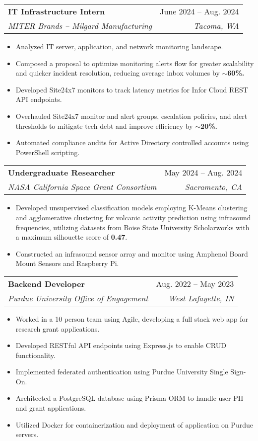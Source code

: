 \documentclass[letterpaper,11pt]{article}
\makeatletter
\newcommand{\resumeItem}[1]{
  \item\small{
    {#1 \vspace{-2pt}}
  }
}
\newcommand{\resumeSubheading}[4]{
  \vspace{-2pt}\item
    \begin{tabular*}{0.97\textwidth}[t]{l@{\extracolsep{\fill}}r}
      \textbf{#1} & #2 \\
      \textit{\small#3} & \textit{\small #4} \\
    \end{tabular*}\vspace{-7pt}
}
\newcommand{\resumeSubSubheading}[2]{
    \item
    \begin{tabular*}{0.97\textwidth}{l@{\extracolsep{\fill}}r}
      \textit{\small#1} & \textit{\small #2} \\
    \end{tabular*}\vspace{-7pt}
}
\newcommand{\resumeSubHeadingListEnd}{\end{itemize}}
\newcommand{\resumeItemListStart}{\begin{itemize}}
\newcommand{\resumeItemListEnd}{\end{itemize}\vspace{-5pt}}
\makeatother
\begin{document}
    \resumeSubheading
      {IT Infrastructure Intern}{June 2024 -- Aug. 2024}
      {MITER Brands -- Milgard Manufacturing}{Tacoma, WA}
      \resumeItemListStart
        \resumeItem{Analyzed IT server, application, and network monitoring landscape.}
        \resumeItem{Composed a proposal to optimize monitoring alerts flow for greater scalability and quicker incident resolution, reducing average inbox volumes by \textbf{$\sim$60\%.}}
        \resumeItem{Developed Site24x7 monitors to track latency metrics for Infor Cloud REST API endpoints.}
        \resumeItem{Overhauled Site24x7 monitor and alert groups, escalation policies, and alert thresholds to mitigate tech debt and improve efficiency by \textbf{$\sim$20\%.}}
        \resumeItem{Automated compliance audits for Active Directory controlled accounts using PowerShell scripting.}
      \resumeItemListEnd
      

    \resumeSubheading
      {Undergraduate Researcher}{May 2024 -- Aug. 2024}
      {NASA California Space Grant Consortium}{Sacramento, CA}
      \resumeItemListStart
      \resumeItem{Developed unsupervised classification models employing K-Means clustering and agglomerative clustering for volcanic activity prediction using infrasound frequencies, utilizing datasets from Boise State University Scholarworks with a maximum silhouette score of \textbf{0.47}.}
        \resumeItem{Constructed an infrasound sensor array and monitor using Amphenol Board Mount Sensors and Raspberry Pi.}
    \resumeItemListEnd

    \resumeSubheading
      {Backend Developer}{Aug. 2022 -- May 2023}
      {Purdue University Office of Engagement}{West Lafayette, IN}
      \resumeItemListStart
      \resumeItem{Worked in a 10 person team using Agile, developing a full stack web app for research grant applications.}
      \resumeItem{Developed RESTful API endpoints using Express.js to enable CRUD functionality.}
      \resumeItem{Implemented federated authentication using Purdue University Single Sign-On.}
        \resumeItem{Architected a PostgreSQL database using Prisma ORM to handle user PII and grant applications.}
        \resumeItem{Utilized Docker for containerization and deployment of application on Purdue servers.}
      \resumeItemListEnd
\end{document}
